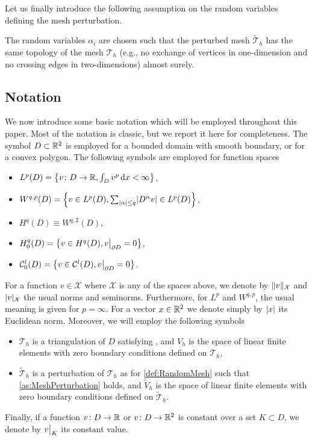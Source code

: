 Let us finally introduce the following assumption on the random variables defining the mesh perturbation. 
\begin{assumption} \label{as:MeshPerturbation}  The random variables $\alpha_i$ are chosen such that the perturbed mesh $\widetilde {\mathcal T}_h$ has the same topology of the mesh $\mathcal T_h$ (e.g., no exchange of vertices in one-dimension and no crossing edges in two-dimensions) almost surely.  
\end{assumption}

\subsection{Notation}

We now introduce some basic notation which will be employed throughout this paper. Most of the notation is classic, but we report it here for completeness. The symbol $D \subset \mathbb{R}^2$ is employed for a bounded domain with smooth boundary, or for a convex polygon. The following symbols are employed for function spaces
\begin{itemize}
	\item $L^p(D) = \left\{v\colon D \to \mathbb{R}, \int_D v^p \,\mathrm{d} x< \infty \right\}$,
	\item $W^{q, p}(D) = \left\{v \in L^p(D), \sum_{\lvert\alpha\rvert\leq q} \lvert D^{\alpha} v\rvert \in L^p(D) \right\}$,
	\item $H^q(D) \equiv W^{q,2}(D)$,
	\item $H^q_0(D) = \left\{v \in H^q(D), v\bigr\rvert_{\partial D} = 0\right\}$,
	\item $\mathcal C^l_0(D) = \left\{v \in \mathcal C^l(D), v\bigr\rvert_{\partial D} = 0\right\}$.
\end{itemize}
For a function $v \in \mathcal X$ where $\mathcal X$ is any of the spaces above, we denote by $\lVert v\rVert_{\mathcal X}$ and $\lvert v\rvert_{\mathcal X}$ the usual norms and seminorms. Furthermore, for $L^p$ and $W^{q,p}$, the usual meaning is given for $p = \infty$. For a vector $x \in \mathbb{R}^2$ we denote simply by $\lvert x\rvert$ its Euclidean norm. Moreover, we will employ the following symbols
\begin{itemize}
	\item $\mathcal T_h$ is a triangulation of $D$ satisfying , and $V_h$ is the space of linear finite elements with zero boundary conditions defined on $\mathcal T_h$,
	\item $\widetilde{\mathcal T}_h$ is a perturbation of $\mathcal T_h$ as for \cref{def:RandomMesh} such that \cref{as:MeshPerturbation} holds, and $\widetilde V_h$ is the space of linear finite elements with zero boundary conditions defined on $\widetilde{\mathcal T}_h$.
\end{itemize}
Finally, if a function $v \colon D \to \mathbb{R}$ or $v \colon D \to \mathbb{R}^2$ is constant over a set $K \subset D$, we denote by $v\bigr\rvert_{K}$ its constant value.

